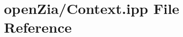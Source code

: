 \hypertarget{_context_8ipp}{}\section{open\+Zia/\+Context.ipp File Reference}
\label{_context_8ipp}
